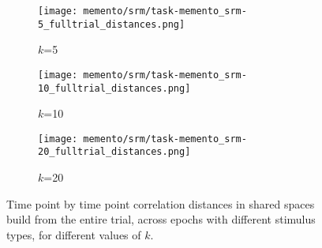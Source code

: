 \begin{figure}
	\centering
	\begin{subfigure}{0.32\textwidth}
		\texttt{[image: memento/srm/task-memento\_srm-5\_fulltrial\_distances.png]}
		\caption{$k$=5}
	\end{subfigure}
	\begin{subfigure}{0.32\textwidth}
		\texttt{[image: memento/srm/task-memento\_srm-10\_fulltrial\_distances.png]}
		\caption{$k$=10}
	\end{subfigure}
	\begin{subfigure}{0.32\textwidth}
		\texttt{[image: memento/srm/task-memento\_srm-20\_fulltrial\_distances.png]}
		\caption{$k$=20}
	\end{subfigure}
	\caption[Time point by time point correlation distances in shared spaces]{Time point by time point correlation distances in shared spaces build from the entire trial, across epochs with different stimulus types, for different values of $k$.}
	\label{fig:srmsharedspacetrial}
\end{figure}





